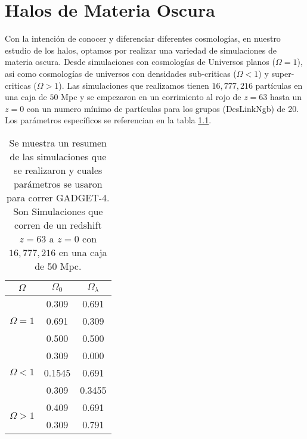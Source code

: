 \chapter{Halos de Materia Oscura}
\setcounter{equation}{0}

\noindent Con la intención de conocer y diferenciar diferentes cosmologías, en nuestro estudio de los halos, optamos por realizar una variedad de simulaciones de materia oscura. Desde simulaciones con cosmologías de Universos planos ($\Omega = 1$), asi como cosmologías  de universos con densidades sub-criticas ($\Omega < 1$) y super-criticas ($\Omega > 1$). Las simulaciones que realizamos tienen $16,777,216$ partículas en una caja de $50$ Mpc y se empezaron en un corrimiento al rojo de $z=63$ hasta un $z=0$ con un numero mínimo de partículas para los grupos (DesLinkNgb) de 20. Los parámetros específicos se referencian en la tabla \ref{tab:Resumen_Sim}.

\begin{table}[]

    \begin{tabular}{|c|c|c|}

    \hline
    $\Omega$ & $\Omega_0$ & $\Omega_\lambda$ \\ \hline
    \multirow{3}{*}{$\Omega = 1$} & 0.309 & 0.691 \\ \cline{2-3} 
     & 0.691 & 0.309 \\ \cline{2-3} 
     & 0.500 & 0.500 \\ \hline
    \multirow{3}{*}{$\Omega < 1$} & 0.309 & 0.000 \\ \cline{2-3} 
     & 0.1545 & 0.691 \\ \cline{2-3} 
     & 0.309 & 0.3455 \\ \hline
    \multirow{2}{*}{$\Omega > 1$} & 0.409 & 0.691 \\ \cline{2-3} 
     & 0.309 & 0.791 \\ \hline
    \end{tabular}
    
    \caption{Se muestra un resumen de las simulaciones que se realizaron y cuales parámetros se usaron para correr GADGET-4. Son Simulaciones que corren de un redshift $z=63$ a $z=0$ con $16,777,216$ en una caja de 50 Mpc.}
    
    \label{tab:Resumen_Sim}

\end{table} 

